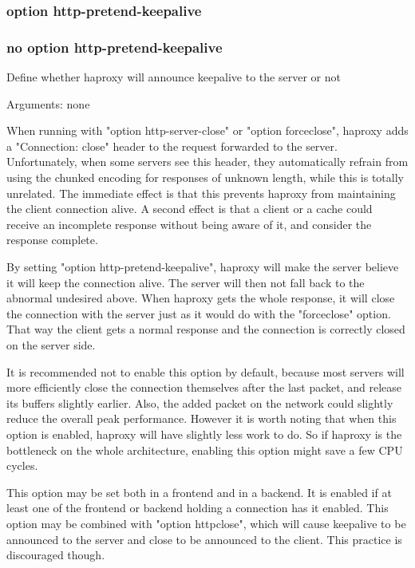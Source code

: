 \subsubsection{option http-pretend-keepalive}
\subsubsection{no option http-pretend-keepalive}


  Define whether haproxy will announce keepalive to the server or not


  Arguments: none

  When running with "option http-server-close" or "option forceclose", haproxy
  adds a "Connection: close" header to the request forwarded to the server.
  Unfortunately, when some servers see this header, they automatically refrain
  from using the chunked encoding for responses of unknown length, while this
  is totally unrelated. The immediate effect is that this prevents haproxy from
  maintaining the client connection alive. A second effect is that a client or
  a cache could receive an incomplete response without being aware of it, and
  consider the response complete.

  By setting "option http-pretend-keepalive", haproxy will make the server
  believe it will keep the connection alive. The server will then not fall back
  to the abnormal undesired above. When haproxy gets the whole response, it
  will close the connection with the server just as it would do with the
  "forceclose" option. That way the client gets a normal response and the
  connection is correctly closed on the server side.

  It is recommended not to enable this option by default, because most servers
  will more efficiently close the connection themselves after the last packet,
  and release its buffers slightly earlier. Also, the added packet on the
  network could slightly reduce the overall peak performance. However it is
  worth noting that when this option is enabled, haproxy will have slightly
  less work to do. So if haproxy is the bottleneck on the whole architecture,
  enabling this option might save a few CPU cycles.

  This option may be set both in a frontend and in a backend. It is enabled if
  at least one of the frontend or backend holding a connection has it enabled.
  This option may be combined with "option httpclose", which will cause
  keepalive to be announced to the server and close to be announced to the
  client. This practice is discouraged though.

